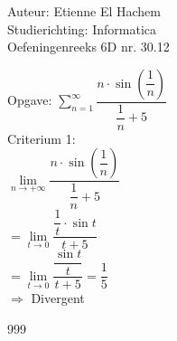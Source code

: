 \documentclass[a4paper]{article}
\begin{document}
  
\noindent \large Auteur: Etienne El Hachem \\
\noindent \large Studierichting: Informatica\\
\noindent \large Oefeningenreeks 6D nr. 30.12\\

\medskip

\normalsize

Opgave: $ \displaystyle\sum_{n=1}^{\infty} \dfrac{n \cdot \sin \left(\dfrac{1}{n}\right)}{\dfrac{1}{n}+5}$ \\

Criterium 1:\\

$\lim\limits_{n \rightarrow +\infty} \dfrac{n \cdot \sin \left(\dfrac{1}{n}\right)}{\dfrac{1}{n}+5}$ \\

$= \lim\limits_{t \rightarrow 0} \dfrac{\dfrac{1}{t} \cdot \sin t}{t+5}$ \\

$= \lim\limits_{t \rightarrow 0} \dfrac{\dfrac{\sin t}{t}}{t+5} = \dfrac{1}{5}$ \\

$\Rightarrow$ Divergent

\begin{thebibliography}{999}
\end{thebibliography}
\end{document}
